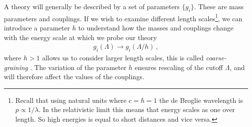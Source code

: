 A theory will generally be described by a set of parameters $\{g_i\}$. These are mass parameters and couplings. If we wish to examine different length scales\footnote{Recall that using natural units where $c=\hbar=1$ the de Broglie wavelength is $p\propto1/\lambda$. In the relativistic limit this means that energy scales as one over length. So high energies is equal to short distances and vice versa. }, we can introduce a parameter $h$ to understand how the masses and couplings change with the energy scale at which we probe our theory
\begin{align} 
    g_i(\Lambda)\to g_i(\Lambda/h)\,,
\end{align}
where $h>1$ allows us to consider larger length scales, this is called \textit{coarse-graining} \cite{Lancaster:2014}. The variation of the parameter $h$ ensures rescaling of the cutoff $\Lambda$, and will therefore affect the values of the couplings. 

